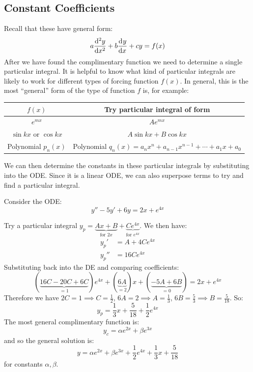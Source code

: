 \documentclass[../main.tex]{subfiles}
\begin{document}
\subsection{Constant Coefficients}
Recall that these have general form:
\[
  a \deriv[2]{y}{x} + b \deriv{y}{x} + cy = f(x)
\]
After we have found the complimentary function we need to determine a single particular integral.
It is helpful to know what kind of particular integrals are likely to work for different types of forcing function $f(x)$.
In general, this is the most ``general'' form of the type of function $f$ is, for example:
\begin{center}
\begin{tabular}{c|c}
\label{PITable}
$f(x)$ & Try particular integral of form \\
\hline
$e^{mx}$ & $Ae^{mx}$ \\
$\sin kx$ or $\cos kx$ & $A \sin kx + B \cos kx$ \\
Polynomial $p_n(x)$ & Polynomial $q_n (x) = a_nx^{n} + a_{n - 1}x^{n-1} + \cdots + a_1 x + a_0$ \\
\end{tabular}
\end{center}
We can then determine the constants in these particular integrals by substituting into the ODE.
Since it is a linear ODE, we can also superpose terms to try and find a particular integral.

\begin{example}
  Consider the ODE:
  \[
    y'' - 5y' + 6y = 2x + e^{4x}
  \]

  Try a particular integral $y_p = \underbrace{Ax + B}_{\text{for }2x} + \underbrace{Ce^{4x}}_{\text{for }e^{4x}}$.
  We then have:
  \begin{align*}
    y_p' &= A + 4Ce^{4x} \\
    y_p'' &= 16Ce^{4x}
  \end{align*}
  Substituting back into the DE and comparing coefficients:
  \[
    (\underbrace{16C - 20C + 6C}_{=1})e^{4x} + (\underbrace{6A}_{=2})x + (\underbrace{-5A + 6B}_{=0}) = 2x + e^{4x}
  \]
  Therefore we have $2C = 1 \implies C = \frac{1}{2}$, $6A = 2 \implies A = \frac{1}{3}$, $6B = \frac{5}{3} \implies B = \frac{5}{18}$.
  So:
  \[
    y_p = \frac{1}{3}x + \frac{5}{18} + \frac{1}{2}e^{4x}
  \]
  The most general complimentary function is:
  \[
    y_c = \alpha e^{2x} + \beta e^{3x}
  \]
  and so the general solution is:
  \[
    y = \alpha e^{2x} + \beta e^{3x} + \frac{1}{2}e^{4x} + \frac{1}{3}x + \frac{5}{18}
  \]
  for constants $\alpha, \beta$.
\end{example}
\end{document}
